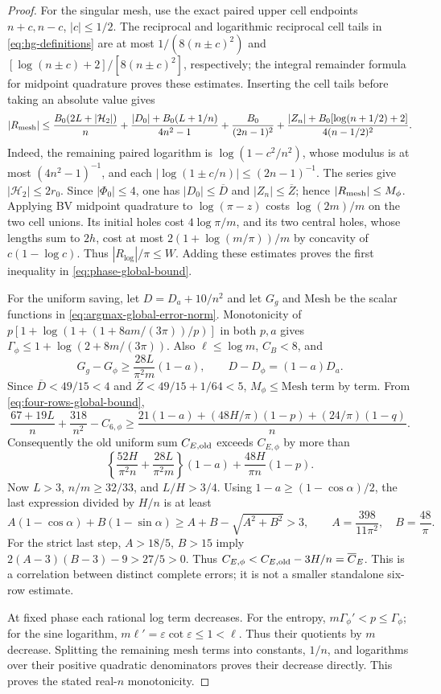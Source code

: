 \begin{proof}
For the singular mesh, use the exact paired upper cell endpoints
$n+c,n-c$, $|c|\leq1/2$. The reciprocal and logarithmic reciprocal
cell tails in \eqref{eq:hg-definitions} are at most
$1/(8(n\pm c)^2)$ and
$[\log(n\pm c)+2]/[8(n\pm c)^2]$, respectively; the integral
remainder formula for midpoint quadrature proves these estimates.
Inserting the cell tails before taking an absolute value gives
\[
 |R_{\rm mesh}|\leq
 \frac{B_0(2L+|\mathcal H_2|)}n
 +\frac{|D_0|+B_0(L+1/n)}{4n^2-1}
 +\frac{B_0}{(2n-1)^2}
 +\frac{|Z_n|+B_0[\log(n+1/2)+2]}{4(n-1/2)^2}.
\]
Indeed, the remaining paired logarithm is
$\log(1-c^2/n^2)$, whose modulus is at most $(4n^2-1)^{-1}$,
and each $|\log(1\pm c/n)|\leq(2n-1)^{-1}$.
The series give $|\mathcal H_2|\leq2r_0$. Since
$|\Phi_0|\leq4$, one has $|D_0|\leq\overline D$ and
$|Z_n|\leq\overline Z$; hence $|R_{\rm mesh}|\leq M_\phi$.
Applying BV midpoint quadrature to $\log(\pi-z)$ costs
$\log(2m)/m$ on the two cell unions. Its initial holes cost
$4\log\pi/m$, and its two central holes, whose lengths sum to $2h$,
cost at most $2(1+\log(m/\pi))/m$ by concavity of
$c(1-\log c)$. Thus $|R_{\log}|/\pi\leq W$.
Adding these estimates proves the first inequality in
\eqref{eq:phase-global-bound}.

For the uniform saving, let $D=D_a+10/n^2$ and let $G_g$ and
$\mathrm{Mesh}$ be the scalar functions in
\eqref{eq:argmax-global-error-norm}. Monotonicity of
$p[1+\log(1+(1+8am/(3\pi))/p)]$ in both $p,a$ gives
$\Gamma_\phi\leq1+\log(2+8m/(3\pi))$. Also $\ell\leq\log m$,
$C_B<8$, and
\[
 G_g-G_\phi\geq\frac{28L}{\pi^2m}(1-a),\qquad
 D-D_\phi=(1-a)D_a.
\]
Since $\overline D<49/15<4$ and $\overline Z<49/15+1/64<5$,
$M_\phi\leq\mathrm{Mesh}$ term by term. From
\eqref{eq:four-rows-global-bound},
\[
 \frac{67+19L}{n}+\frac{318}{n^2}-C_{6,\phi}
 \geq\frac{21(1-a)+(48H/\pi)(1-p)+(24/\pi)(1-q)}n.
\]
Consequently the old uniform sum $C_{E,\rm old}$ exceeds
$C_{E,\phi}$ by more than
\[
 \left\{\frac{52H}{\pi^2n}+\frac{28L}{\pi^2m}\right\}(1-a)
                  +\frac{48H}{\pi n}(1-p).
\]
Now $L>3$, $n/m\geq32/33$, and $L/H>3/4$. Using
$1-a\geq(1-\cos\alpha)/2$, the last expression divided by $H/n$
is at least
\[
 A(1-\cos\alpha)+B(1-\sin\alpha)
 \geq A+B-\sqrt{A^2+B^2}>3,
 \qquad A=\frac{398}{11\pi^2},\quad B=\frac{48}\pi.
\]
For the strict last step, $A>18/5$, $B>15$ imply
$2(A-3)(B-3)-9>27/5>0$. Thus
$C_{E,\phi}<C_{E,\rm old}-3H/n=\overline C_E$.
This is a correlation between distinct complete errors; it is not a
smaller standalone six-row estimate.

At fixed phase each rational log term decreases. For the entropy,
$m\Gamma_\phi'<p\leq\Gamma_\phi$; for the sine logarithm,
$m\ell'=\varepsilon\cot\varepsilon\leq1<\ell$.
Thus their quotients by $m$ decrease. Splitting the remaining mesh
terms into constants, $1/n$, and logarithms over their positive
quadratic denominators proves their decrease directly. This proves
the stated real-$n$ monotonicity.
\end{proof}

